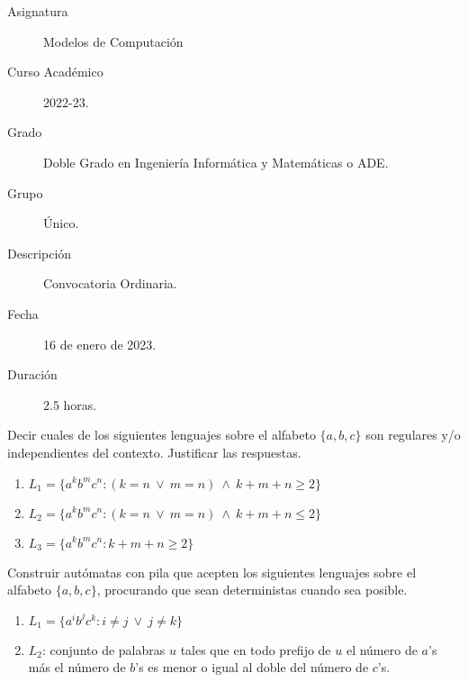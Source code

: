 \documentclass[12pt]{article}
\begin{document}

    
    

    \begin{description}
        \item[Asignatura] Modelos de Computación
        \item[Curso Académico] 2022-23.
        \item[Grado] Doble Grado en Ingeniería Informática y Matemáticas o ADE.
        \item[Grupo] Único.
        \item[Descripción] Convocatoria Ordinaria.
        \item[Fecha] 16 de enero de 2023.
        \item[Duración] $2.5$ horas.    
    \end{description}
    \newpage

    \begin{ejercicio}[2.5 puntos]
        Decir cuales de los siguientes lenguajes sobre el alfabeto $\{a, b, c\}$ son regulares y/o independientes del contexto. Justificar las respuestas.
        \begin{enumerate}
            \item $L_1 = \{a^k b^m c^n : (k = n ~\lor~ m = n) ~\land~ k + m + n \geq 2\}$
            \item $L_2 = \{a^k b^m c^n : (k = n ~\lor~ m = n) ~\land~ k + m + n \leq 2\}$
            \item $L_3 = \{a^k b^m c^n : k + m + n \geq 2\}$
        \end{enumerate}
    \end{ejercicio}

    \begin{ejercicio}[2.5 puntos]
        Construir autómatas con pila que acepten los siguientes lenguajes sobre el alfabeto $\{a, b, c\}$, procurando que sean deterministas cuando sea posible.
        \begin{enumerate}
            \item $L_1 = \{a^i b^j c^k : i \neq j ~\lor~ j \neq k\}$
            \item $L_2$: conjunto de palabras $u$ tales que en todo prefijo de $u$ el número de $a$'s más el número de $b$'s es menor o igual al doble del número de $c$'s.
        \end{enumerate}
    \end{ejercicio}
\end{document}
